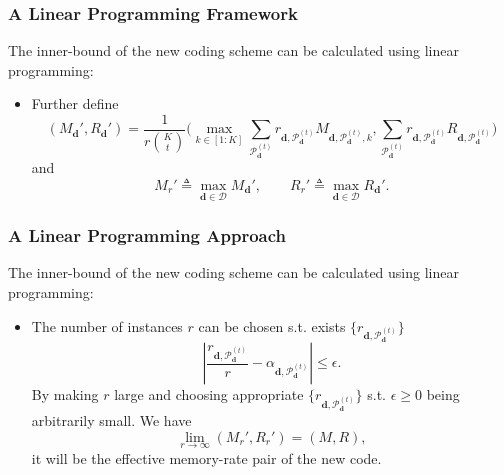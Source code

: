 \documentclass{beamer}
\begin{document}
%
\begin{frame}
\frametitle{A Linear Programming Framework}
The inner-bound of the new coding scheme can be calculated using linear programming:
\begin{itemize}
\item Further define 
\begin{equation*}
(M_{\boldsymbol{d}}', R_{\boldsymbol{d}}') =\frac{1}{r\binom{K}{t}} \Bigg( \max_{k \in [1:K]}\sum_{\boldsymbol{\mathcal{P}}_{\boldsymbol{d}}^{(t)}} r_{\boldsymbol{d},\boldsymbol{\mathcal{P}}_{\boldsymbol{d}}^{(t)}} M_{\boldsymbol{d},\boldsymbol{\mathcal{P}}_{\boldsymbol{d}}^{(t)},k}, \sum_{\boldsymbol{\mathcal{P}}_{\boldsymbol{d}}^{(t)}} r_{\boldsymbol{d},\boldsymbol{\mathcal{P}}_{\boldsymbol{d}}^{(t)}} R_{\boldsymbol{d},\boldsymbol{\mathcal{P}}_{\boldsymbol{d}}^{(t)}} \Bigg)
\end{equation*}
and 
\begin{equation*}
M_r' \triangleq \max_{\boldsymbol{d} \in \mathcal{D}} M_{\boldsymbol{d}}', \qquad R_r' \triangleq \max_{\boldsymbol{d} \in \mathcal{D}} R_{\boldsymbol{d}}' .
\end{equation*}
\end{itemize}
\end{frame}

\begin{frame}
\frametitle{A Linear Programming Approach}
The inner-bound of the new coding scheme can be calculated using linear programming:
\begin{itemize}
\item The number of instances $r$ can be chosen s.t. exists $\{r_{\boldsymbol{d},\boldsymbol{\mathcal{P}}_{\boldsymbol{d}}^{(t)}}\}$ 
\begin{equation*}
\left|\frac{r_{\boldsymbol{d},\boldsymbol{\mathcal{P}}_{\boldsymbol{d}}^{(t)}}}{r}-\alpha_{\boldsymbol{d},\boldsymbol{\mathcal{P}}_{\boldsymbol{d}}^{(t)}}\right| \leq \epsilon.
\end{equation*}
By making $r$ large and choosing appropriate $\{r_{\boldsymbol{d},\boldsymbol{\mathcal{P}}_{\boldsymbol{d}}^{(t)}}\}$ s.t. $\epsilon \geq 0$ being arbitrarily small. We have 
\begin{equation*}
\lim_{r \rightarrow \infty}(M_r', R_r')=(M,R),
\end{equation*}
it will be the effective memory-rate pair of the new code.
\end{itemize}
\end{frame}
\end{document}

